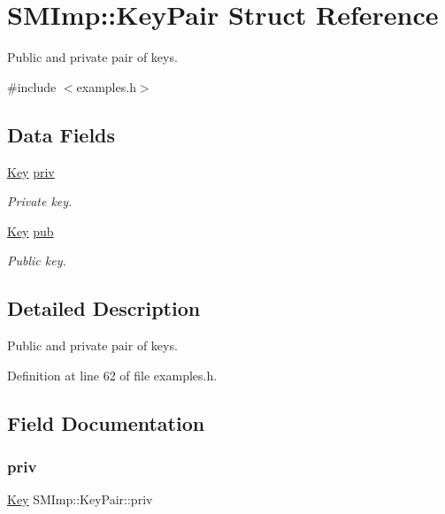 \hypertarget{structSMImp_1_1KeyPair}{}\section{S\+M\+Imp\+:\+:Key\+Pair Struct Reference}
\label{structSMImp_1_1KeyPair}


Public and private pair of keys.  




{\ttfamily \#include $<$examples.\+h$>$}

\subsection*{Data Fields}
\begin{DoxyCompactItemize}
\item 
\hyperlink{structSMImp_1_1Key}{Key} \hyperlink{structSMImp_1_1KeyPair_a412d05120b041e9785ccc84a40fe63f0}{priv}
\begin{DoxyCompactList}\small\item\em Private key. \end{DoxyCompactList}\item 
\hyperlink{structSMImp_1_1Key}{Key} \hyperlink{structSMImp_1_1KeyPair_acb11a05be94b45f5f2b4ee7a78884e4c}{pub}
\begin{DoxyCompactList}\small\item\em Public key. \end{DoxyCompactList}\end{DoxyCompactItemize}


\subsection{Detailed Description}
Public and private pair of keys. 

Definition at line 62 of file examples.\+h.



\subsection{Field Documentation}
\mbox{\label{structSMImp_1_1KeyPair_a412d05120b041e9785ccc84a40fe63f0}} 
\subsubsection{\texorpdfstring{priv}{priv}}
{\footnotesize\ttfamily \hyperlink{structSMImp_1_1Key}{Key} S\+M\+Imp\+::\+Key\+Pair\+::priv}



